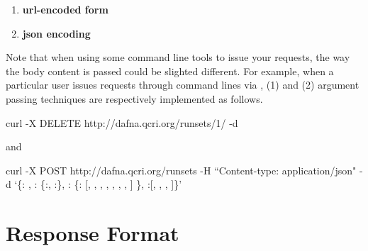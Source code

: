 \documentclass[a4paper,10pt]{scrartcl}
\begin{document}
\begin{enumerate}
 \item \textbf{url-encoded form}
 \item \textbf{json encoding}
\end{enumerate}

Note that when using some command line tools to issue your requests, the way the body content is passed could be slighted different.
For example, when a particular user issues requests through command lines via
\href{http://curl.haxx.se/}{}, (1) and (2) argument passing techniques are respectively implemented as follows.
\begin{description}
 \item curl -X DELETE http://dafna.qcri.org/runsets/1/ -d \\
 \item and \\
 \item curl -X POST http://dafna.qcri.org/runsets -H ``Content-type: application/json" -d `\{: , : \{:, :\}, : \{: [, , , , , , , ] \}, :[, , , ]\}' 
\end{description}
\section{Response Format}
\end{document}
